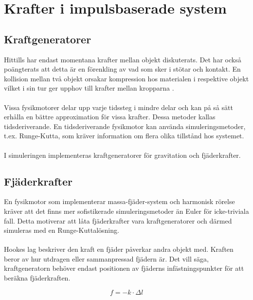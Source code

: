 \documentclass[a4paper,12pt,twopage,swedish]{article}
\begin{document}
\section{Krafter i impulsbaserade system}

\subsection{Kraftgeneratorer}

Hittills har endast momentana krafter mellan objekt diskuterats. Det har också poängterats att detta är en förenkling av vad som sker i stötar och kontakt. En kollision mellan två objekt orsakar kompression hos materialen i respektive objekt vilket i sin tur ger upphov till krafter mellan kropparna \cite{newton87}.
\\
\\Vissa fysikmotorer delar upp varje tidssteg i mindre delar och kan på så sätt erhålla en bättre approximation för vissa krafter. Dessa metoder kallas tidsderiverande. En tidsderiverande fysikmotor kan använda simuleringsmetoder, t.ex. Runge-Kutta, som kräver information om  flera olika tillstånd hos systemet.
\\
\\I simuleringen implementeras kraftgeneratorer för gravitation och fjäderkrafter.


\subsection{Fjäderkrafter}
En fysikmotor som implementerar massa-fjäder-system och harmonisk rörelse kräver att det finns mer sofistikerade simuleringsmetoder än Euler för icke-triviala fall. Detta motiverar att låta fjäderkrafter vara kraftgeneratorer och därmed simuleras med en Runge-Kuttalösning.
\\
\\Hookes lag beskriver den kraft en fjäder påverkar andra objekt med. Kraften beror av hur utdragen eller sammanpressad fjädern är. Det vill säga, kraftgeneratorn behöver endast positionen av fjäderns infästningspunkter för att beräkna fjäderkraften. 

\begin{equation}\label{eq:hookes_law}
f = - k \cdot \Delta l
\end{equation}
\end{document}
